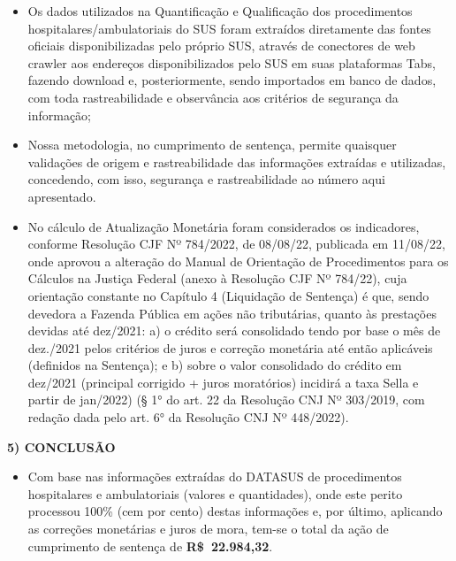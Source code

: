 \documentclass{article}
\begin{document}
    \begin{itemize}
    \item Os dados utilizados na Quantificação e Qualificação dos procedimentos hospitalares/ambulatoriais do SUS foram extraídos diretamente das fontes oficiais disponibilizadas pelo próprio SUS, através de conectores de web crawler aos endereços disponibilizados pelo SUS em suas plataformas Tabs, fazendo download e, posteriormente, sendo importados em banco de dados, com toda rastreabilidade e observância aos critérios de segurança da informação;
    
    \item Nossa metodologia, no cumprimento de sentença, permite quaisquer validações de origem e rastreabilidade das informações extraídas e utilizadas, concedendo, com isso, segurança e rastreabilidade ao número aqui apresentado.
    
    \item No cálculo de Atualização Monetária foram considerados os indicadores, conforme Resolução CJF Nº 784/2022, de 08/08/22, publicada em 11/08/22, onde aprovou a alteração do Manual de Orientação de Procedimentos para os Cálculos na Justiça Federal (anexo à Resolução CJF Nº 784/22), cuja orientação constante no Capítulo 4 (Liquidação de Sentença) é que, sendo devedora a Fazenda Pública em ações não tributárias, quanto às prestações devidas até dez/2021: a) o crédito será consolidado tendo por base o mês de dez./2021 pelos critérios de juros e correção monetária até então aplicáveis (definidos na Sentença); e b) sobre o valor consolidado do crédito em dez/2021 (principal corrigido + juros moratórios) incidirá a taxa Sella e partir de jan/2022) (§ 1° do art. 22 da Resolução CNJ Nº 303/2019, com redação dada pelo art. 6° da Resolução CNJ Nº 448/2022).
    \end{itemize}
    
    \vspace{10mm}
    
    \textbf{5) CONCLUSÃO}
    
    \begin{itemize}
    \item Com base nas informações extraídas do DATASUS de procedimentos hospitalares e ambulatoriais (valores e quantidades), onde este perito processou 100\% (cem por cento) destas informações e, por último, aplicando as correções monetárias e juros de mora, tem-se o total da ação de cumprimento de sentença de \textbf{R\$ 22.984,32}.
    \end{itemize}
    
\end{document}
